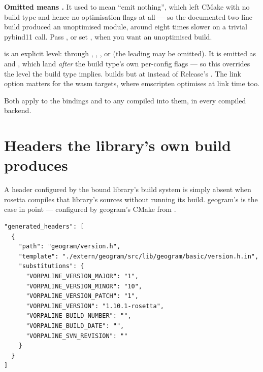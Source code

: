 \begin{note}
\textbf{Omitted means .} It used to mean ``emit nothing'', which
left CMake with no build type and hence no optimisation flags at all --- so the
documented two-line build produced an unoptimised module, around eight times
slower on a trivial pybind11 call. Pass , or
set , when you want an unoptimised build.
\end{note}

 is an explicit level:  through ,
, ,  or  (the leading \code{-} may be
omitted). It is emitted as  and
, which land \emph{after} the build type's own
per-config flags --- so this  overrides the level the build type
implies.  builds
 but at  instead of Release's . The link
option matters for the wasm targets, where emscripten optimises at link time
too.

Both apply to the bindings and to any  compiled into them,
in every compiled backend.

\section{Headers the library's own build produces}
\label{sec:generatedheaders}

A header configured by the bound library's build system is simply absent when
rosetta compiles that library's sources without running its build. geogram's
 is the case in point --- configured by geogram's
CMake from .

\begin{lstlisting}[style=json]
"generated_headers": [
  {
    "path": "geogram/version.h",
    "template": "./extern/geogram/src/lib/geogram/basic/version.h.in",
    "substitutions": {
      "VORPALINE_VERSION_MAJOR": "1",
      "VORPALINE_VERSION_MINOR": "10",
      "VORPALINE_VERSION_PATCH": "1",
      "VORPALINE_VERSION": "1.10.1-rosetta",
      "VORPALINE_BUILD_NUMBER": "",
      "VORPALINE_BUILD_DATE": "",
      "VORPALINE_SVN_REVISION": ""
    }
  }
]
\end{lstlisting}

